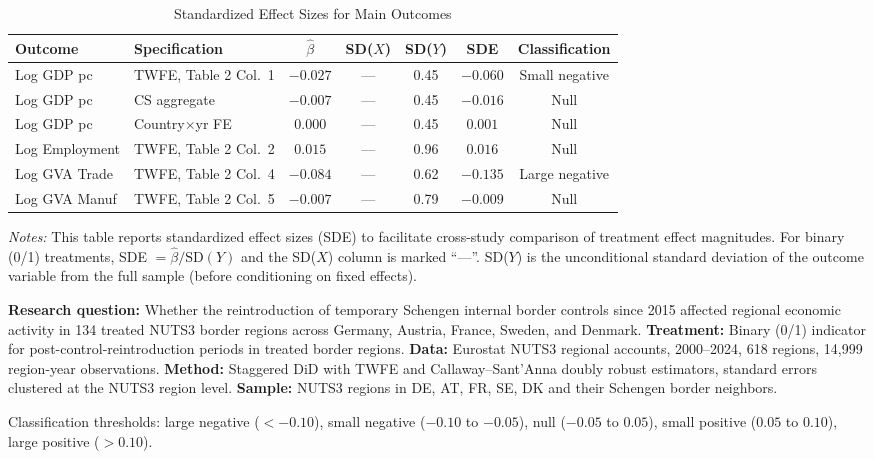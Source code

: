 \documentclass[12pt]{article}
\begin{document}
\begin{table}[H]
\centering
\caption{Standardized Effect Sizes for Main Outcomes}
\label{tab:sde}
\begin{adjustbox}{max width=\textwidth}
\begin{tabular}{llccccc}
\toprule
Outcome & Specification & $\hat{\beta}$ & SD($X$) & SD($Y$) & SDE & Classification \\
\midrule
Log GDP pc & TWFE, Table 2 Col.\ 1 & $-0.027$ & --- & 0.45 & $-0.060$ & Small negative \\
Log GDP pc & CS aggregate & $-0.007$ & --- & 0.45 & $-0.016$ & Null \\
Log GDP pc & Country$\times$yr FE & $0.000$ & --- & 0.45 & $0.001$ & Null \\
Log Employment & TWFE, Table 2 Col.\ 2 & $0.015$ & --- & 0.96 & $0.016$ & Null \\
Log GVA Trade & TWFE, Table 2 Col.\ 4 & $-0.084$ & --- & 0.62 & $-0.135$ & Large negative \\
Log GVA Manuf & TWFE, Table 2 Col.\ 5 & $-0.007$ & --- & 0.79 & $-0.009$ & Null \\
\bottomrule
\end{tabular}
\end{adjustbox}
\par\vspace{0.3em}
{\footnotesize \emph{Notes:} This table reports standardized effect sizes (SDE)
to facilitate cross-study comparison of treatment effect magnitudes.
For binary (0/1) treatments, SDE $= \hat{\beta} / \text{SD}(Y)$ and the SD($X$)
column is marked ``---''.
SD($Y$) is the unconditional standard deviation of the outcome variable from the full sample (before conditioning on fixed effects).

\textbf{Research question:} Whether the reintroduction of temporary Schengen internal border controls since 2015 affected regional economic activity in 134 treated NUTS3 border regions across Germany, Austria, France, Sweden, and Denmark.
\textbf{Treatment:} Binary (0/1) indicator for post-control-reintroduction periods in treated border regions.
\textbf{Data:} Eurostat NUTS3 regional accounts, 2000--2024, 618 regions, 14,999 region-year observations.
\textbf{Method:} Staggered DiD with TWFE and Callaway--Sant'Anna doubly robust estimators, standard errors clustered at the NUTS3 region level.
\textbf{Sample:} NUTS3 regions in DE, AT, FR, SE, DK and their Schengen border neighbors.

Classification thresholds:
large negative ($< -0.10$), small negative ($-0.10$ to $-0.05$),
null ($-0.05$ to $0.05$), small positive ($0.05$ to $0.10$),
large positive ($> 0.10$).}
\end{table}
\end{document}
